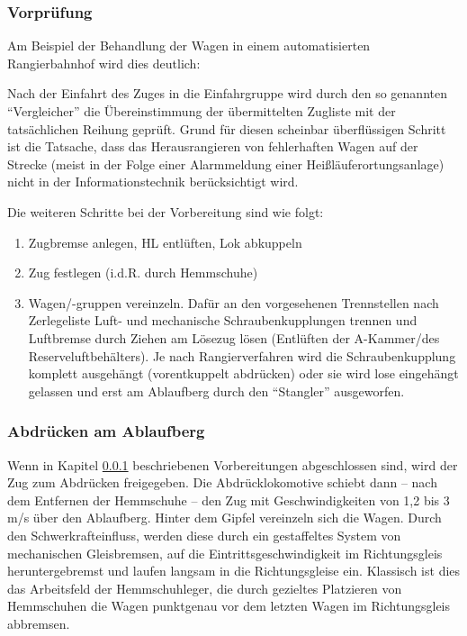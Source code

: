 \subsubsection{Vorprüfung}\label{sec:Vorpruefung}
Am Beispiel der Behandlung der Wagen in einem automatisierten \gls{Rangierbahnhof} wird dies deutlich:\par
Nach der Einfahrt des Zuges in die Einfahrgruppe wird durch den so genannten "`Vergleicher"' die Übereinstimmung der übermittelten Zugliste mit der tatsächlichen Reihung geprüft. Grund für diesen scheinbar überflüssigen Schritt ist die Tatsache, dass das Herausrangieren von fehlerhaften Wagen auf der Strecke (meist in der Folge einer Alarmmeldung einer Heißläuferortungsanlage) nicht in der Informationstechnik berücksichtigt wird.\par
Die weiteren Schritte bei der Vorbereitung sind wie folgt:
\begin{enumerate}
    \item Zugbremse anlegen, \acrshort{HL} entlüften, Lok abkuppeln
    \item Zug festlegen (i.d.R. durch \gls{Hemmschuh}e)
    \item Wagen/-gruppen vereinzeln. Dafür an den vorgesehenen Trennstellen nach Zerlegeliste Luft- und mechanische Schraubenkupplungen trennen und Luftbremse durch Ziehen am Lösezug lösen (Entlüften der A-Kammer/des Reserveluftbehälters). Je nach Rangierverfahren wird die Schraubenkupplung komplett ausgehängt (vorentkuppelt abdrücken) oder sie wird lose eingehängt gelassen und erst am \gls{Ablaufberg} durch den "`Stangler"' ausgeworfen.
\end{enumerate}
\subsubsection{Abdrücken am Ablaufberg}\label{sec:Abdruecken}
Wenn in Kapitel \ref{sec:Vorpruefung} beschriebenen Vorbereitungen abgeschlossen sind, wird der Zug zum Abdrücken freigegeben. Die Abdrücklokomotive schiebt dann -- nach dem Entfernen der Hemmschuhe -- den Zug mit Geschwindigkeiten von 1,2 bis 3 m/s %
über den \gls{Ablaufberg}. Hinter dem Gipfel vereinzeln sich die Wagen. Durch den Schwerkrafteinfluss, werden diese durch ein gestaffeltes System von mechanischen Gleisbremsen, auf die Eintrittsgeschwindigkeit im Richtungsgleis heruntergebremst und laufen langsam in die Richtungsgleise ein.  Klassisch ist dies das Arbeitsfeld der Hemmschuhleger, die durch gezieltes Platzieren von Hemmschuhen die Wagen punktgenau vor dem letzten Wagen im Richtungsgleis abbremsen.
